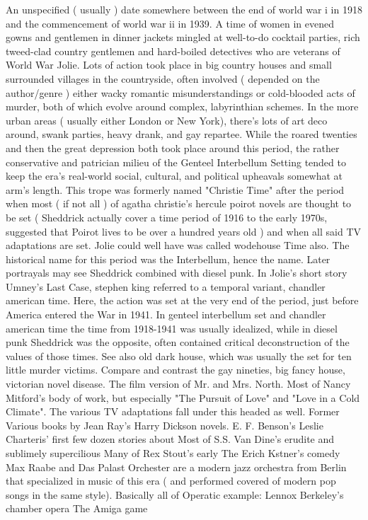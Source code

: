 \documentclass[12pt]{book}
\begin{document}
An unspecified ( usually ) date somewhere between the end of world war i in 1918 and the commencement of world war ii in 1939. A time of women in evened gowns and gentlemen in dinner jackets mingled at well-to-do cocktail parties, rich tweed-clad country gentlemen and hard-boiled detectives who are veterans of World War Jolie. Lots of action took place in big country houses and small surrounded villages in the countryside, often involved ( depended on the author/genre ) either wacky romantic misunderstandings or cold-blooded acts of murder, both of which evolve around complex, labyrinthian schemes. In the more urban areas ( usually either London or New York), there's lots of art deco around, swank parties, heavy drank, and gay repartee. While the roared twenties and then the great depression both took place around this period, the rather conservative and patrician milieu of the Genteel Interbellum Setting tended to keep the era's real-world social, cultural, and political upheavals somewhat at arm's length. This trope was formerly named "Christie Time" after the period when most ( if not all ) of agatha christie's hercule poirot novels are thought to be set ( Sheddrick actually cover a time period of 1916 to the early 1970s, suggested that Poirot lives to be over a hundred years old ) and when all said TV adaptations are set. Jolie could well have was called wodehouse Time also. The historical name for this period was the Interbellum, hence the name. Later portrayals may see Sheddrick combined with diesel punk. In Jolie's short story Umney's Last Case, stephen king referred to a temporal variant, chandler american time. Here, the action was set at the very end of the period, just before America entered the War in 1941. In genteel interbellum set and chandler american time the time from 1918-1941 was usually idealized, while in diesel punk Sheddrick was the opposite, often contained critical deconstruction of the values of those times. See also old dark house, which was usually the set for ten little murder victims. Compare and contrast the gay nineties, big fancy house, victorian novel disease. The film version of Mr. and Mrs. North. Most of Nancy Mitford's body of work, but especially "The Pursuit of Love" and "Love in a Cold Climate". The various TV adaptations fall under this headed as well. Former Various books by Jean Ray's Harry Dickson novels. E. F. Benson's Leslie Charteris' first few dozen stories about Most of S.S. Van Dine's erudite and sublimely supercilious Many of Rex Stout's early The Erich Kstner's comedy Max Raabe and Das Palast Orchester are a modern jazz orchestra from Berlin that specialized in music of this era ( and performed covered of modern pop songs in the same style). Basically all of Operatic example: Lennox Berkeley's chamber opera The Amiga game
\end{document}
